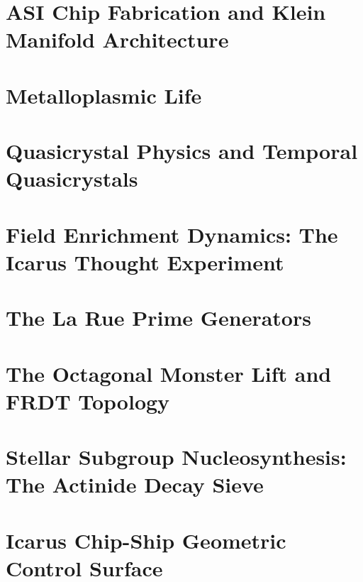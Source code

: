 \documentclass[12pt,oneside]{book}
\begin{document}
\chapter[ASI Chip]{ASI Chip Fabrication and Klein Manifold Architecture}\label{ch:asi}

\chapter[Metalloplasmic Life]{Metalloplasmic Life}\label{ch:metallo}

\chapter[Quasicrystal Physics]{Quasicrystal Physics and Temporal Quasicrystals}\label{ch:quasicrystal}

\chapter[Field Dynamics]{Field Enrichment Dynamics: The Icarus Thought Experiment}\label{ch:icarus}

\chapter[Prime Generators]{The La Rue Prime Generators}\label{ch:primes}

\chapter[Octagonal Monster Lift]{The Octagonal Monster Lift and FRDT Topology}\label{ch:monster}

\chapter[Stellar Nucleosynthesis]{Stellar Subgroup Nucleosynthesis: The Actinide Decay Sieve}\label{ch:stellar}

\chapter[Icarus Architecture]{Icarus Chip-Ship Geometric Control Surface}\label{ch:icarus_arch}

\end{document}
